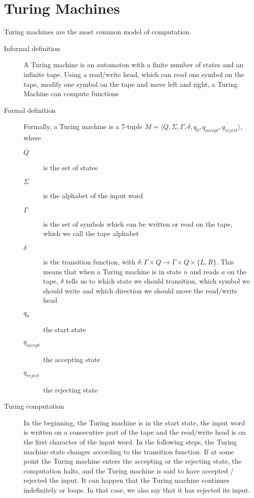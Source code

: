 \section{Turing Machines}\label{sec:turing-machines}
Turing machines are the most common model of computation.
\begin{description}
    \item[Informal definition] A Turing machine is an automaton with a finite number of states and an infinite tape.
    Using a read/write head, which can read one symbol on the tape, modify one symbol on the tape and move left and right, a Turing Machine can compute functions
    \item[Formal definition] Formally, a Turing machine is a 7-tuple $M = \langle  Q, \Sigma, \Gamma, \delta, q_0, q_{accept}, q_{reject}\rangle$, where
    \begin{description}
        \item[$Q$] is the set of states
        \item[$\Sigma$] is the alphabet of the input word
        \item[$\Gamma$] is the set of symbols which can be written or read on the tape, which we call the tape alphabet
        \item[$\delta$] is the transition function, with $\delta : \Gamma \times Q \to \Gamma \times Q \times \{L, R\}$.
        This means that when a Turing machine is in state $n$ and reads $a$ on the tape, $\delta$ tells us to which state we should transition, which symbol we should write and which direction we should move the read/write head
        \item[$q_0$] the start state
        \item[$q_{accept}$] the accepting state
        \item[$q_{reject}$] the rejecting state
    \end{description}
    \item[Turing computation] In the beginning, the Turing machine is in the start state, the input word is written on a consecutive part of the tape and the read/write head is on the first character of the input word.
    In the following steps, the Turing machine state changes according to the transition function.
    If at some point the Turing machine enters the accepting or the rejecting state, the computation halts, and the Turing machine is said to have accepted / rejected the input.
    It can happen that the Turing machine continues indefinitely or loops.
    In that case, we also say that it has rejected its input.

\end{description}
